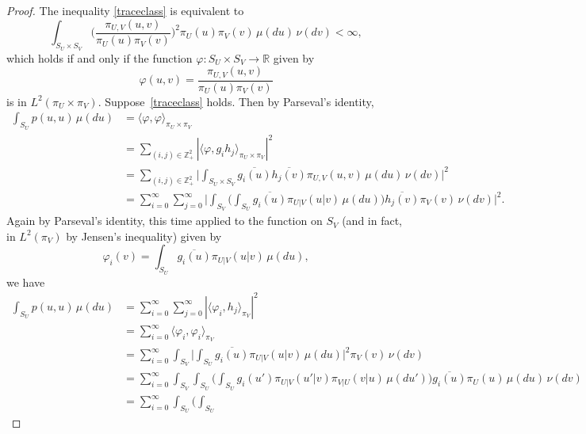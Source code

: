 \documentclass[11pt]{article}
\begin{document}
\begin{proof}
		The inequality \eqref{traceclass} is equivalent to
		\[
		\int_{S_U \times S_V}
                \bigg(\frac{\pi_{U,V}(u,v)}{\pi_U(u)\pi_V(v)}\bigg)^2
                \pi_U(u) \pi_V(v) \, \mu(du) \, \nu(dv) < \infty,
		\]
		which holds if and only if the function $\varphi:
                S_U\times S_V \to \mathbb{R}$ given by
		\[
		\varphi(u, v) = \frac{\pi_{U,V}(u,v)}{\pi_U(u)\pi_V(v)}
		\]
		is in $L^2(\pi_U \times \pi_V).$
                Suppose~\eqref{traceclass} holds.  Then by Parseval's
                identity,
		\begin{equation*} \nonumber
		\begin{aligned}
                  \int_{S_U} p(u, u) \, \mu(du) &= \langle \varphi, \varphi \rangle_{\pi_U \times \pi_V} \\
                  &= \sum_{(i,j) \in \mathbb{Z}_+^2} |\langle \varphi, g_ih_j \rangle_{\pi_U \times \pi_V}|^2 \\
                  &= \sum_{(i,j)\in \mathbb{Z}_+^2} \Big| \int_{S_U\times S_V} \overline{g_i(u)} \overline{h_j(v)} \pi_{U,V}(u,v) \, \mu(du)\,\nu(dv) \Big|^2 \\
                  &= \sum_{i=0}^{\infty} \sum_{j=0}^{\infty} \Big|
                  \int_{S_V} \Big(\int_{S_U} \overline{g_i(u)}
                  \pi_{U|V}(u|v) \, \mu(du) \Big) \overline{h_j(v)}
                  \pi_V(v) \,\nu(dv) \Big|^2.
		\end{aligned}
		\end{equation*}
		Again by Parseval's identity, this time applied to the function on $S_V$ (and in fact, in $L^2(\pi_V)$ by Jensen's inequality) given by
		\[
		\varphi_i(v) = \int_{S_U} \overline{g_i(u)} \pi_{U|V}(u|v) \, \mu(du),
		\]
		we have
		\begin{equation} \label{trace2}
		\begin{aligned}
                  \int_{S_U} p(u, u) \, \mu(du) &= \sum_{i=0}^{\infty} \sum_{j=0}^{\infty} |\langle \varphi_i, h_j \rangle_{\pi_V}|^2 \\
                  &= \sum_{i=0}^{\infty} \langle \varphi_i, \varphi_i \rangle_{\pi_V} \\
                  &= \sum_{i=0}^{\infty} \int_{S_V} \Big|\int_{S_U} \overline{g_i(u)} \pi_{U|V}(u|v) \, \mu(du) \Big|^2 \pi_V(v) \, \nu(dv) \\
                  &= \sum_{i=0}^{\infty} \int_{S_V} \int_{S_U} \Big(\int_{S_U} g_i(u') \pi_{U|V}(u'|v) \pi_{V|U}(v|u) \, \mu(du') \Big) \overline{g_i(u)} \pi_U(u) \, \mu(du) \, \nu(dv) \\
                  &= \sum_{i=0}^{\infty} \int_{S_U} \Big(\int_{S_U}

\end{aligned}
\end{equation}
\end{proof}
\end{document}
